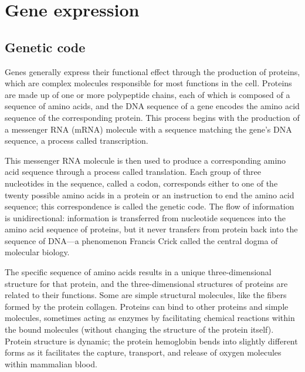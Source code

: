 \hypertarget{gene-expression}{%
\section{Gene expression}\label{gene-expression}}

\hypertarget{genetic-code}{%
\subsection{Genetic code}\label{genetic-code}}

Genes generally express their functional effect through the production of proteins, which are complex molecules responsible for most functions in the cell. Proteins are made up of one or more polypeptide chains, each of which is composed of a sequence of amino acids, and the DNA sequence of a gene encodes the amino acid sequence of the corresponding protein. This process begins with the production of a messenger RNA (mRNA) molecule with a sequence matching the gene's DNA sequence, a process called transcription.

This messenger RNA molecule is then used to produce a corresponding amino acid sequence through a process called translation. Each group of three nucleotides in the sequence, called a codon, corresponds either to one of the twenty possible amino acids in a protein or an instruction to end the amino acid sequence; this correspondence is called the genetic code. The flow of information is unidirectional: information is transferred from nucleotide sequences into the amino acid sequence of proteins, but it never transfers from protein back into the sequence of DNA---a phenomenon Francis Crick called the central dogma of molecular biology.

The specific sequence of amino acids results in a unique three-dimensional structure for that protein, and the three-dimensional structures of proteins are related to their functions. Some are simple structural molecules, like the fibers formed by the protein collagen. Proteins can bind to other proteins and simple molecules, sometimes acting as enzymes by facilitating chemical reactions within the bound molecules (without changing the structure of the protein itself). Protein structure is dynamic; the protein hemoglobin bends into slightly different forms as it facilitates the capture, transport, and release of oxygen molecules within mammalian blood.

